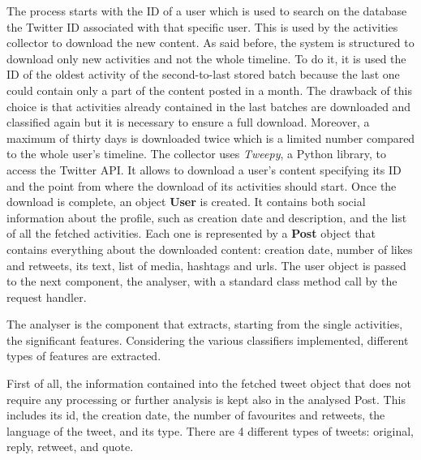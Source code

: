 The process starts with the ID of a user which is used to search on the database the Twitter ID associated with that specific user. 
This is used by the activities collector to download the new content. As said before, the system is structured to download only new activities and not the whole timeline.
To do it, it is used the ID of the oldest activity of the second-to-last stored batch because the last one could contain only a part of the content posted in a month. 
The drawback of this choice is that activities already contained in the last batches are downloaded and classified again but it is necessary to ensure a full download. Moreover, a maximum of thirty days is downloaded twice which is a limited number compared to the whole user's timeline.
The collector uses \textit{Tweepy}, a Python library, to access the Twitter API. It allows to download a user's content specifying its ID and the point from where the download of its activities should start.
Once the download is complete, an object \textbf{User} is created. It contains both social information about the profile, such as creation date and description, and the list of all the fetched activities. Each one is represented by a \textbf{Post} object that contains everything about the downloaded content: creation date, number of likes and retweets, its text, list of media, hashtags and urls.
The user object is passed to the next component, the analyser, with a standard class method call by the request handler.

The analyser is the component that extracts, starting from the single activities, the significant features.
Considering the various classifiers implemented, different types of features are extracted.

First of all, the information contained into the fetched tweet object that does not require any processing or further analysis is kept also in the analysed Post. This includes its id, the creation date, the number of favourites and retweets, the language of the tweet, and its type.
There are 4 different types of tweets: original, reply, retweet, and quote.

